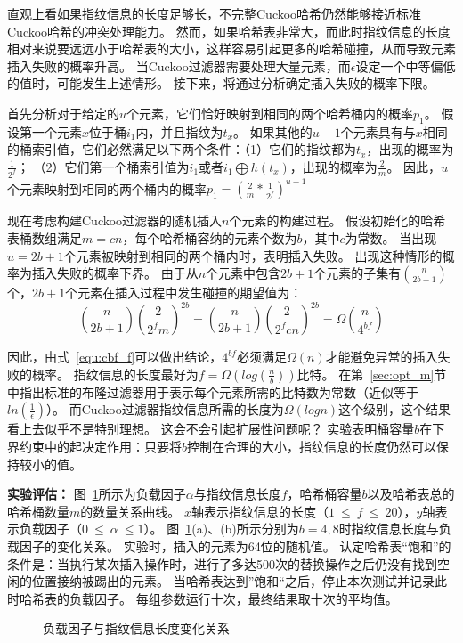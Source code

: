 直观上看如果指纹信息的长度足够长，不完整Cuckoo哈希仍然能够接近标准Cuckoo哈希的冲突处理能力。
然而，如果哈希表非常大，而此时指纹信息的长度相对来说要远远小于哈希表的大小，这样容易引起更多的哈希碰撞，从而导致元素插入失败的概率升高。
当Cuckoo过滤器需要处理大量元素，而$\epsilon$设定一个中等偏低的值时，可能发生上述情形。
接下来，将通过分析确定插入失败的概率下限。

首先分析对于给定的$u$个元素，它们恰好映射到相同的两个哈希桶内的概率$p_1$。
假设第一个元素$x$位于桶$i_1$内，并且指纹为$t_x$。
如果其他的$u-1$个元素具有与$x$相同的桶索引值，它们必然满足以下两个条件：（1）它们的指纹都为$t_x$，出现的概率为$\frac{1}{2^f}$；
（2）它们第一个桶索引值为$i_1$或者$i_1 \bigoplus h(t_x)$，出现的概率为$\frac{2}{m}$。
因此，$u$个元素映射到相同的两个桶内的概率$p_1 = (\frac{2}{m}\ast \frac{1}{2^f})^{u-1}$

现在考虑构建Cuckoo过滤器的随机插入$n$个元素的构建过程。
假设初始化的哈希表桶数组满足$m = cn$，每个哈希桶容纳的元素个数为$b$，其中$c$为常数。
当出现$u = 2b+1$个元素被映射到相同的两个桶内时，表明插入失败。
出现这种情形的概率为插入失败的概率下界。
由于从$n$个元素中包含$2b+1$个元素的子集有$\binom{n}{2b+1}$个，$2b+1$个元素在插入过程中发生碰撞的期望值为：
\begin{equation}
\binom{n}{2b+1}(\frac{2}{2^fm})^{2b} = \binom{n}{2b+1}(\frac{2}{2^f{cn}})^{2b} = \Omega(\frac{n}{4^{bf}}) 
\label{equ:cbf_f}
\end{equation}

因此，由式~\ref{equ:cbf_f}可以做出结论，$4^{bf}$必须满足$\Omega(n)$才能避免异常的插入失败的概率。
指纹信息的长度最好为$f = \Omega(log(\frac{n}{b}))$比特。
在第~\ref{sec:opt_m}节中指出标准的布隆过滤器用于表示每个元素所需的比特数为常数（近似等于$ln(\frac{1}{\epsilon})$）。
而Cuckoo过滤器指纹信息所需的长度为$\Omega(logn)$这个级别，这个结果看上去似乎不是特别理想。
这会不会引起扩展性问题呢？
实验表明桶容量$b$在下界约束中的起决定作用：只要将$b$控制在合理的大小，指纹信息的长度仍然可以保持较小的值。

\textbf{实验评估：}
图~\ref{fig:cbf_fingerprint_size}所示为负载因子$\alpha$与指纹信息长度$f$，哈希桶容量$b$以及哈希表总的哈希桶数量$m$的数量关系曲线。
$x$轴表示指纹信息的长度（$1~\leq ~f~\leq ~20$），$y$轴表示负载因子（$0~\leq ~\alpha ~\leq 1$）。
图~\ref{fig:cbf_fingerprint_size}(a)、(b)所示分别为$b = 4,8$时指纹信息长度与负载因子的变化关系。
实验时，插入的元素为64位的随机值。
认定哈希表“饱和”的条件是：当执行某次插入操作时，进行了多达500次的替换操作之后仍没有找到空闲的位置接纳被踢出的元素。
当哈希表达到”饱和“之后，停止本次测试并记录此时哈希表的负载因子。
每组参数运行十次，最终结果取十次的平均值。
\begin{figure}[htbp]
\centering
{}
\caption{负载因子与指纹信息长度变化关系}
\label{fig:cbf_fingerprint_size}
\end{figure}

